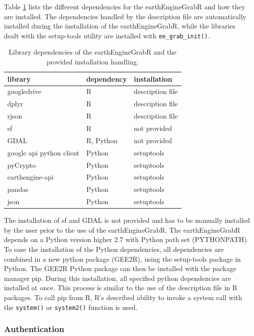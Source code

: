 Table \ref*{dependencies} lists the different dependencies for the earthEngineGrabR and how they are installed. 
The dependencies handled by the description file are automatically installed during the installation of the earthEngineGrabR, while the libraries dealt with the setup-tools utility are installed with \texttt{ee\_grab\_init()}.
\begin{table}[h]
		\caption{Library dependencies of the earthEngineGrabR and the provided installation handling.}
	\begin{tabularx}{\textwidth}{XXl}
		\toprule
		\textbf{library} & \textbf{dependency} & \textbf{installation}  \\
		\midrule
		googledrive & R  & description file  \\
		dplyr & R  & description file  \\
		rjson & R  & description file  \\
		sf & R  & not provided  \\
		GDAL & R, Python  & not provided  \\
		google api python client & Python  & setuptools  \\
		pyCrypto & Python  & setuptools  \\
		earthengine-api & Python  & setuptools  \\        
		pandas & Python  & setuptools  \\        
		json & Python  & setuptools  \\        
		\bottomrule
	\end{tabularx}

	\label{dependencies}
\end{table}
 The installation of sf and GDAL is not provided and has to be manually installed by the user prior to the use of the earthEngineGrabR. The earthEngineGrabR depends on a Python version higher 2.7 with Python path set (PYTHONPATH). To ease the installation of the Python dependencies, all dependencies are combined in a new python package (GEE2R), using the setup-tools package in Python. The GEE2R Python package can then be installed with the package manager pip. During this installation, all specified python dependencies are installed at once. This process is similar to the use of the description file in R packages. To call pip from R, R's described ability to invoke a system call with the \texttt{system()} or \texttt{system2()} function is used.

\subsubsection{Authentication}

